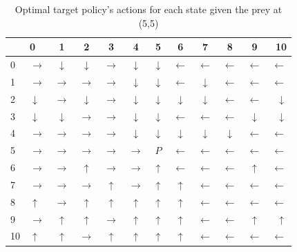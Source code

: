 \documentclass[paper=a4, fontsize=11pt]{scrartcl}
\numberwithin{equation}{section}		%
\numberwithin{figure}{section}			%
\numberwithin{table}{section}				%
\begin{document}
\begin{table}[H]
\caption{Optimal target policy's actions for each state given the prey at (5,5)}
\centering
\begin{tabular}{l|l*{9}{c}r}
  \hline
 & 0 & 1 & 2 & 3 & 4 & 5 & 6 & 7 & 8 & 9 & 10 \\ \hline 
0 & $\rightarrow$&	$\downarrow$&	$\downarrow$&	$\rightarrow$&	$\downarrow$&	$\downarrow$&	$\leftarrow$&	$\leftarrow$&	$\leftarrow$&	$\leftarrow$&	$\leftarrow$\\	
1&$\rightarrow$&	$\rightarrow$&	$\rightarrow$&	$\rightarrow$&	$\downarrow$&	$\downarrow$&	$\leftarrow$&	$\downarrow$&	$\leftarrow$&	$\leftarrow$&	$\leftarrow$	\\
2&$\downarrow$&	$\rightarrow$&	$\downarrow$&	$\rightarrow$&	$\downarrow$&	$\downarrow$&	$\downarrow$&	$\downarrow$&	$\leftarrow$&	$\leftarrow$&	$\downarrow$\\	
3&$\downarrow$	&$\downarrow$&	$\rightarrow$&	$\rightarrow$&	$\downarrow$&	$\downarrow$&	$\leftarrow$&	$\leftarrow$&	$\leftarrow$&	$\downarrow$&	$\downarrow$\\	
4&$\rightarrow$&	$\rightarrow$&	$\rightarrow$&	$\rightarrow$  &	$\downarrow$&	$\downarrow$&	$\downarrow$&	$\downarrow$&	$\downarrow$&	$\leftarrow$&	$\leftarrow$\\	
5&$\rightarrow$  &	$\rightarrow$  &	$\rightarrow$  &	$\rightarrow$ &	$\rightarrow$ &	$P$ &	$\leftarrow$&	$\leftarrow$&	$\leftarrow$&	$\leftarrow$&	$\leftarrow$\\	
6&$\rightarrow$ &	$\rightarrow$ &	$\uparrow$&	$\rightarrow$ &	$\rightarrow$ &	$\uparrow$&	$\leftarrow$&	$\leftarrow$&	$\leftarrow$&	$\uparrow$&	$\leftarrow$\\	
7&$\rightarrow$ &	$\rightarrow$ &	$\rightarrow$ &	$\uparrow$&	$\rightarrow$ &	$\uparrow$&	$\uparrow$&	$\leftarrow$&	$\leftarrow$&	$\leftarrow$&	$\leftarrow$\\	
8&$\uparrow$&	$\rightarrow$ &	$\uparrow$&	$\uparrow$&	$\uparrow$&	$\uparrow$&	$\uparrow$&	$\leftarrow$&	$\leftarrow$&	$\leftarrow$&	$\leftarrow$\\	
9&$\rightarrow$ &	$\uparrow$&	$\uparrow$&	$\rightarrow$ &	$\uparrow$&	$\uparrow$&	$\uparrow$&	$\leftarrow$&	$\leftarrow$&	$\uparrow$&	$\uparrow$\\	
10&$\uparrow$&	$\uparrow$&	$\rightarrow$ &	$\uparrow$&	$\uparrow$&	$\uparrow$&	$\uparrow$&	$\leftarrow$&	$\leftarrow$&	$\leftarrow$&	$\leftarrow$
\end{tabular}
\label{table:TargetPolicyOff}
\end{table}
\end{document}
